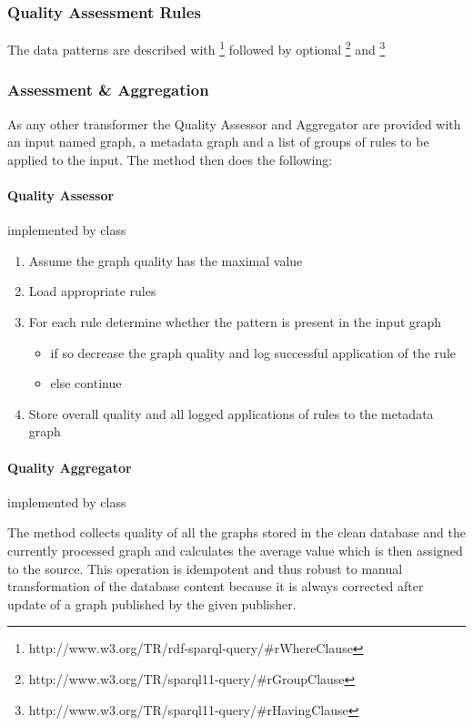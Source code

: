 \subsubsection*{Quality Assessment Rules}

The data patterns are described with \footnote{http://www.w3.org/TR/rdf-sparql-query/#rWhereClause} followed by optional \footnote{http://www.w3.org/TR/sparql11-query/#rGroupClause} and \footnote{http://www.w3.org/TR/sparql11-query/#rHavingClause}

\subsubsection*{Assessment \& Aggregation}

As any other transformer the Quality Assessor and Aggregator are provided with an input named graph, a metadata graph and a list of groups of rules to be applied to the input. The  method then does the following:

\paragraph{Quality Assessor} implemented by class 

\begin{enumerate}
	\item Assume the graph quality has the maximal value
	\item Load appropriate rules
	\item For each rule determine whether the pattern is present in the input graph
	\begin{itemize}
		\item if so decrease the graph quality and log successful application of the rule
		\item else continue
	\end{itemize}
	\item Store overall quality and all logged applications of rules to the metadata graph
\end{enumerate}

\paragraph{Quality Aggregator} implemented by class 

The  method collects quality of all the graphs stored in the clean database and the currently processed graph and calculates the average value which is then assigned to the source. This operation is idempotent and thus robust to manual transformation of the database content because it is always corrected after update of a graph published by the given publisher.

